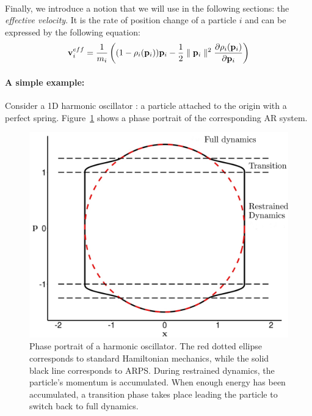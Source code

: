\paragraph*{}
Finally, we introduce a notion that we will use in the following sections: the \textit{effective velocity}. It is the rate of position change of a particle $i$ and can be expressed by the following equation:
\begin{equation}
    \label{eq:adaptiveVelocity}
    \mathbf{v}_{i}^{eff} = \frac{1}{m_{i}} \left( (1-\rho_{i}(\mathbf{p}_{i}))\mathbf{p}_{i} - \frac{1}{2} \parallel \mathbf{p}_{i} \parallel^2 \frac{\partial \rho_{i}(\mathbf{p}_{i})}{\partial \mathbf{p}_{i}}\right)
\end{equation}

\paragraph*{A simple example:}
Consider a 1D harmonic oscillator : a particle attached to the origin with a perfect spring.
Figure~\ref{fig:harmonicOscillatorPhasePortrait} shows a phase portrait of the corresponding
AR system.

\begin{figure}[!h]
	\centering
	\includegraphics[width=0.8\linewidth]{images/arps-vriphys2013/harmonicOscillatorPhasePortraitraw_hacked.png}
	\caption[ARPS: Phase portrait of a ARPS harmonic oscillator]{\label{fig:harmonicOscillatorPhasePortrait} Phase portrait of a harmonic oscillator. The red dotted ellipse corresponds to standard Hamiltonian mechanics, while the solid black line corresponds to ARPS. During restrained dynamics, the particle's momentum is accumulated. When enough energy has been accumulated, a transition phase takes place leading the particle to switch back to full dynamics.}
\end{figure}

